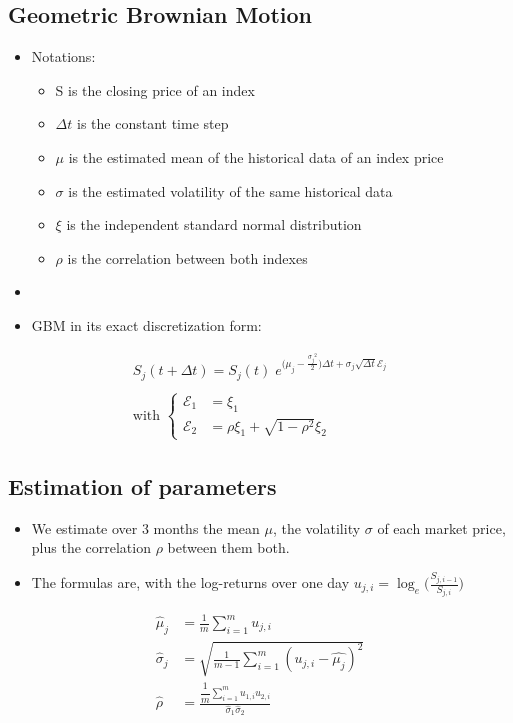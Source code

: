 \subsection{Geometric Brownian Motion}
\begin{frame}
\myframetitle{}
\begin{itemize}
  \item Notations:
	\begin{itemize}
		\item S is the closing price of an index%
		\item $\Delta t$ is the constant time step%
		\item $\mu$ is the estimated mean of the historical data of an index price
		\item $\sigma$ is the estimated volatility of the same historical data
		\item $\xi$ is the independent standard normal distribution
		\item $\rho$ is the correlation between both indexes
	\end{itemize}
	\item []
	\item GBM in its exact discretization form:
\end{itemize}
\begin{gather*}
	S_j(t+\Delta t) = S_j(t) \;
		e^{\bigl(\mu_j-\frac{{\sigma_j}^2}{2}\bigr)\Delta t+\sigma_j \sqrt{\Delta t}\mathcal{E}_j} 
	\\
	\\
	\mbox{with }
	\left \{
	\begin{array}{ll}
    \mathcal{E}_1 & = \xi_1 \\
    \mathcal{E}_2 & = \rho\xi_1 + \sqrt{1-\rho^2}\xi_2
  \end{array}
	\right.
\end{gather*}
\end{frame}

\subsection{Estimation of parameters}
\begin{frame}
\myframetitle{}
\begin{itemize}
	\item We estimate over 3 months the mean $\mu$, the volatility $\sigma$ of each market price, plus the correlation $\rho$ between them both.
	\item The formulas are, with the log-returns over one day $u_{j,i} = \log_e\bigl(\frac{S_{j,i-1}}{S_{j,i}}\bigr)$
\end{itemize}
\begin{align*}
	\hat{\mu}_j    &= \frac{1}{m} \sum_{i=1}^m u_{j,i} \\
	\hat{\sigma}_j &= \sqrt{\frac{1}{m-1} \sum_{i=1}^m (u_{j,i}-\hat{\mu_j})^2} \\
	\hat{\rho}   \;&= \frac{\dfrac{1}{m}\sum_{i=1}^m u_{1,i}u_{2,i}}{\hat{\sigma}_1 \hat{\sigma}_2}
\end{align*}
\end{frame}
